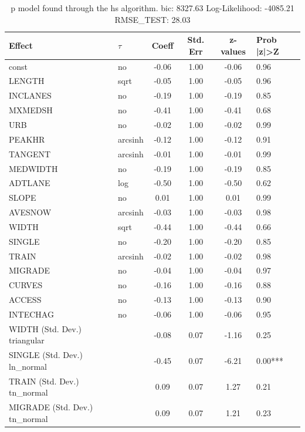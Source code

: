 \begin{table}
	\caption{p model found through the hs algorithm. bic: 8327.63 Log-Likelihood: -4085.21 RMSE_TEST: 28.03}
	\begin{center}
		\begin{tabular}{|l|l|c|c|c|l|}
			\hline
			Effect & $\tau$ & Coeff & Std. Err & z-values & Prob |z|>Z \\
			\hline
			const & no & -0.06 & 1.00 & -0.06 & 0.96 \\
			\hline
			LENGTH & sqrt & -0.05 & 1.00 & -0.05 & 0.96 \\
			\hline
			INCLANES & no & -0.19 & 1.00 & -0.19 & 0.85 \\
			\hline
			MXMEDSH & no & -0.41 & 1.00 & -0.41 & 0.68 \\
			\hline
			URB & no & -0.02 & 1.00 & -0.02 & 0.99 \\
			\hline
			PEAKHR & arcsinh & -0.12 & 1.00 & -0.12 & 0.91 \\
			\hline
			TANGENT & arcsinh & -0.01 & 1.00 & -0.01 & 0.99 \\
			\hline
			MEDWIDTH & no & -0.19 & 1.00 & -0.19 & 0.85 \\
			\hline
			ADTLANE & log & -0.50 & 1.00 & -0.50 & 0.62 \\
			\hline
			SLOPE & no & 0.01 & 1.00 & 0.01 & 0.99 \\
			\hline
			AVESNOW & arcsinh & -0.03 & 1.00 & -0.03 & 0.98 \\
			\hline
			WIDTH & sqrt & -0.44 & 1.00 & -0.44 & 0.66 \\
			\hline
			SINGLE & no & -0.20 & 1.00 & -0.20 & 0.85 \\
			\hline
			TRAIN & arcsinh & -0.02 & 1.00 & -0.02 & 0.98 \\
			\hline
			MIGRADE & no & -0.04 & 1.00 & -0.04 & 0.97 \\
			\hline
			CURVES & no & -0.16 & 1.00 & -0.16 & 0.88 \\
			\hline
			ACCESS & no & -0.13 & 1.00 & -0.13 & 0.90 \\
			\hline
			INTECHAG & no & -0.06 & 1.00 & -0.06 & 0.95 \\
			\hline
			WIDTH (Std. Dev.) triangular &  & -0.08 & 0.07 & -1.16 & 0.25 \\
			\hline
			SINGLE (Std. Dev.) ln_normal &  & -0.45 & 0.07 & -6.21 & 0.00*** \\
			\hline
			TRAIN (Std. Dev.) tn_normal &  & 0.09 & 0.07 & 1.27 & 0.21 \\
			\hline
			MIGRADE (Std. Dev.) tn_normal &  & 0.09 & 0.07 & 1.21 & 0.23 \\

\end{tabular}
\end{center}
\end{table}
